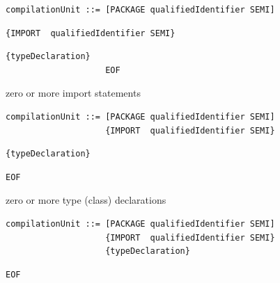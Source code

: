 \documentclass[8pt,a4paper,compress]{beamer}
\begin{document}
\begin{frame}[fragile]
\begin{overprint}
\begin{tcolorbox}[enhanced,drop shadow southwest,sharp corners,size=fbox,colback=white,fontlower=\small\ttfamily,collower=silver900]

\begin{lstlisting}[language={},style=focusout]
compilationUnit ::= [PACKAGE qualifiedIdentifier SEMI]
\end{lstlisting}
\begin{lstlisting}[language={},style=focusin,backgroundcolor=\color{lime100}]
                    {IMPORT  qualifiedIdentifier SEMI}
\end{lstlisting}
\begin{lstlisting}[language={},style=focusout]
                    {typeDeclaration} 
                    EOF
\end{lstlisting}

\tcblower
\begin{minipage}[t][.25cm][t]{\textwidth}
zero or more import statements
\end{minipage}
\end{tcolorbox}

\begin{tcolorbox}[enhanced,drop shadow southwest,sharp corners,size=fbox,colback=white,fontlower=\small\ttfamily,collower=silver900]

\begin{lstlisting}[language={},style=focusout]
compilationUnit ::= [PACKAGE qualifiedIdentifier SEMI]
                    {IMPORT  qualifiedIdentifier SEMI}
\end{lstlisting}
\begin{lstlisting}[language={},style=focusin,backgroundcolor=\color{lime100}]
                    {typeDeclaration} 
\end{lstlisting}
\begin{lstlisting}[language={},style=focusout]
                    EOF
\end{lstlisting}
\tcblower
\begin{minipage}[t][.25cm][t]{\textwidth}
zero or more type (class) declarations
\end{minipage}
\end{tcolorbox}

\begin{tcolorbox}[enhanced,drop shadow southwest,sharp corners,size=fbox,colback=white,fontlower=\small\ttfamily,collower=silver900]

\begin{lstlisting}[language={},style=focusout]
compilationUnit ::= [PACKAGE qualifiedIdentifier SEMI]
                    {IMPORT  qualifiedIdentifier SEMI}
                    {typeDeclaration} 
\end{lstlisting}
\begin{lstlisting}[language={},style=focusin,backgroundcolor=\color{lime100}]
                    EOF
\end{lstlisting}


\end{tcolorbox}
\end{overprint}
\end{frame}
\end{document}
